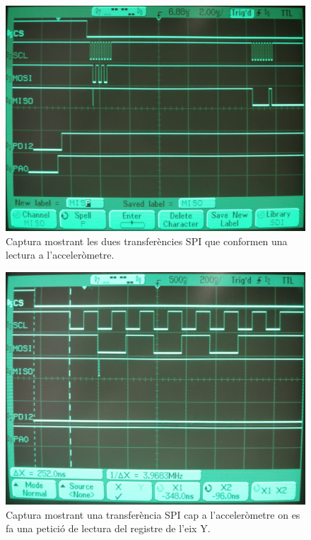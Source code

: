\begin{figure}
  \includegraphics[width=.99\columnwidth]{../photos/analyzer/interrupt-accel}
  \caption{ \label{fig:p4-analyzer-transfers} Captura mostrant les dues transferències SPI que conformen una lectura a l'acceleròmetre. }
\end{figure}

\begin{figure}
  \includegraphics[width=.99\columnwidth]{../photos/analyzer/interrupt-accel-cmd}
  \caption{ \label{fig:p4-analyzer-cmd} Captura mostrant una transferència SPI cap a l'acceleròmetre on es fa una petició de lectura del registre de l'eix Y. }
\end{figure}

